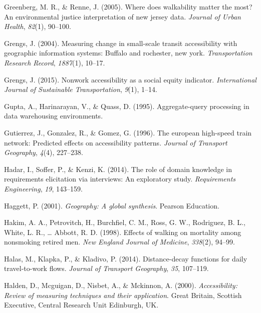 \documentclass[
11pt, %
oneside, %
english, %
singlespacing, %
]{macthesis} %
\newlength{\cslhangindent}
\newenvironment{CSLReferences}[2] %
 {%
  \setlength{\parindent}{0pt}
  \ifodd #1 \everypar{\setlength{\hangindent}{\cslhangindent}}\ignorespaces\fi
  \ifnum #2 > 0
  \setlength{\parskip}{#2\baselineskip}
  \fi
 }%
 {}
\begin{document}
\begin{CSLReferences}{1}{0}
\leavevmode{}%
Greenberg, M. R., \& Renne, J. (2005). Where does walkability matter the most? An environmental justice interpretation of new jersey data. \emph{Journal of Urban Health}, \emph{82}(1), 90--100.

\leavevmode{}%
Grengs, J. (2004). Measuring change in small-scale transit accessibility with geographic information systems: Buffalo and rochester, new york. \emph{Transportation Research Record}, \emph{1887}(1), 10--17.

\leavevmode{}%
Grengs, J. (2015). Nonwork accessibility as a social equity indicator. \emph{International Journal of Sustainable Transportation}, \emph{9}(1), 1--14.

\leavevmode{}%
Gupta, A., Harinarayan, V., \& Quass, D. (1995). Aggregate-query processing in data warehousing environments.

\leavevmode{}%
Gutierrez, J., Gonzalez, R., \& Gomez, G. (1996). The european high-speed train network: Predicted effects on accessibility patterns. \emph{Journal of Transport Geography}, \emph{4}(4), 227--238.

\leavevmode{}%
Hadar, I., Soffer, P., \& Kenzi, K. (2014). The role of domain knowledge in requirements elicitation via interviews: An exploratory study. \emph{Requirements Engineering}, \emph{19}, 143--159.

\leavevmode{}%
Haggett, P. (2001). \emph{Geography: A global synthesis}. Pearson Education.

\leavevmode{}%
Hakim, A. A., Petrovitch, H., Burchfiel, C. M., Ross, G. W., Rodriguez, B. L., White, L. R., \ldots{} Abbott, R. D. (1998). Effects of walking on mortality among nonsmoking retired men. \emph{New England Journal of Medicine}, \emph{338}(2), 94--99.

\leavevmode{}%
Halas, M., Klapka, P., \& Kladivo, P. (2014). Distance-decay functions for daily travel-to-work flows. \emph{Journal of Transport Geography}, \emph{35}, 107--119.

\leavevmode{}%
Halden, D., Mcguigan, D., Nisbet, A., \& Mckinnon, A. (2000). \emph{Accessibility: Review of measuring techniques and their application}. Great Britain, Scottish Executive, Central Research Unit Edinburgh, UK.


\end{CSLReferences}
\end{document}
